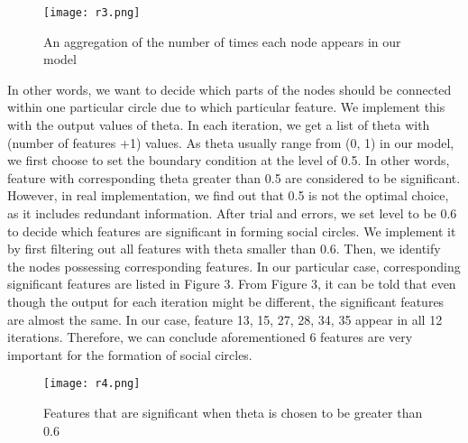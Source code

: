 \documentclass[12pt,a4paper]{article}
\begin{document}
\begin{figure}[H]
\centering
\texttt{[image: r3.png]}
\caption{An aggregation of the number of times each node appears in our model}
\end{figure}

\par In other words, we want to decide which parts of the nodes should be connected within one particular circle due to which particular feature. We implement this with the output values of theta. In each iteration, we get a list of theta with (number of features +1) values. As theta usually range from (0, 1) in our model, we first choose to set the boundary condition at the level of 0.5. In other words, feature with corresponding theta greater than 0.5 are considered to be significant. However, in real implementation, we find out that 0.5 is not the optimal choice, as it includes redundant information. After trial and errors, we set level to be 0.6 to decide which features are significant in forming social circles. We implement it by first filtering out all features with theta smaller than 0.6.  Then, we identify the nodes possessing corresponding features. In our particular case, corresponding significant features are listed in Figure 3. From Figure 3, it can be told that even though the output for each iteration might be different, the significant features are almost the same. In our case, feature 13, 15, 27, 28, 34, 35 appear in all 12 iterations. Therefore, we can conclude aforementioned 6 features are very important for the formation of social circles. 

\begin{figure}[H]
\centering
\texttt{[image: r4.png]}
\caption{Features that are significant when theta is chosen to be greater than 0.6}
\end{figure}
\printbibliography
\end{document}
